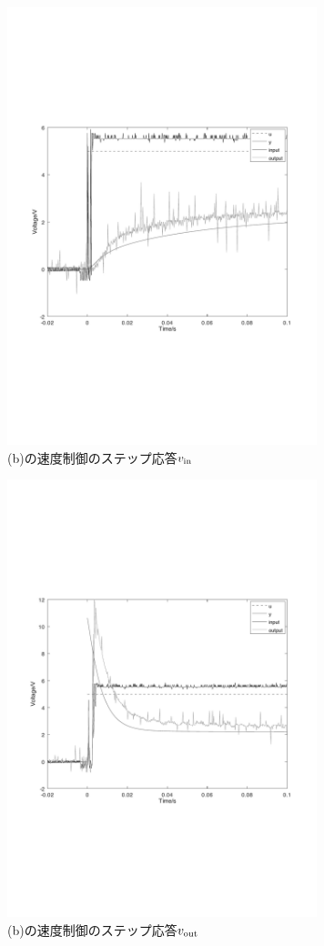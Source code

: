 \documentclass[uplatex, 11pt,a4j, titlepage]{jsarticle}
\begin{document}
\begin{figure}[h]
    \centering
    \includegraphics[width=9cm]{unitvbin.pdf}
    \caption{(b)の速度制御のステップ応答$v_{\rm in}$}
    \label{unitvbin}
\end{figure}

\begin{figure}[h]
    \centering
    \includegraphics[width=9cm]{unitvbout.pdf}
    \caption{(b)の速度制御のステップ応答$v_{\rm out}$}
    \label{unitvbout}
\end{figure}
\end{document}
